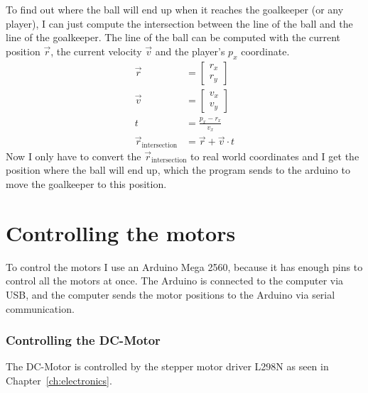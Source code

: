To find out where the ball will end up when it reaches the goalkeeper (or any player), I can just compute the intersection between the line of the ball and the line of the goalkeeper.
The line of the ball can be computed with the current position $\vec{r}$, the current velocity $\vec{v}$ and the player's $p_x$ coordinate.
\begin{equation}
    \begin{split}
        \vec{r} &= \begin{bmatrix}
                       r_x \\
                       r_y
        \end{bmatrix}\\
        \vec{v} &= \begin{bmatrix}
                       v_x \\
                       v_y
        \end{bmatrix}\\
        t &= \frac{p_x - r_x}{v_x}\\
        \vec{r}_\text{intersection} &= \vec{r} + \vec{v} \cdot t
    \end{split}\label{eq:ball_intersection}
\end{equation}
Now I only have to convert the $\vec{r}_\text{intersection}$ to real world coordinates and I get the position where the ball will end up, which the program sends to the arduino to move the goalkeeper to this position.


\section{Controlling the motors}\label{sec:controlling-the-motors}
To control the motors I use an Arduino Mega 2560, because it has enough pins to control all the motors at once.
The Arduino is connected to the computer via USB, and the computer sends the motor positions to the Arduino via serial communication.

\subsubsection{Controlling the DC-Motor}\label{subsubsec:controlling-the-dc-motor}
The DC-Motor is controlled by the stepper motor driver L298N as seen in Chapter~\ref{ch:electronics}.




